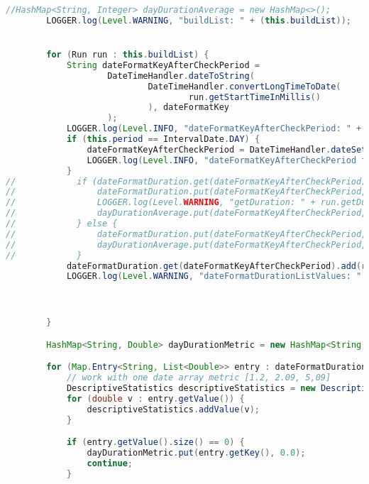 \begin{lstlisting}[language=Java]
        //HashMap<String, Integer> dayDurationAverage = new HashMap<>();
        LOGGER.log(Level.WARNING, "buildList: " + (this.buildList));


        for (Run run : this.buildList) {
            String dateFormatKeyAfterCheckPeriod =
                    DateTimeHandler.dateToString(
                            DateTimeHandler.convertLongTimeToDate(
                                    run.getStartTimeInMillis()
                            ), dateFormatKey
                    );
            LOGGER.log(Level.INFO, "dateFormatKeyAfterCheckPeriod: " + dateFormatKeyAfterCheckPeriod);
            if (this.period == IntervalDate.DAY) {
                dateFormatKeyAfterCheckPeriod = DateTimeHandler.dateSetZeroMinutesSeconds(dateFormatKeyAfterCheckPeriod);
                LOGGER.log(Level.INFO, "dateFormatKeyAfterCheckPeriod for day zero: " + dateFormatKeyAfterCheckPeriod);
            }
//            if (dateFormatDuration.get(dateFormatKeyAfterCheckPeriod) == 0.0) {
//                dateFormatDuration.put(dateFormatKeyAfterCheckPeriod, run.getDuration() / 1000.0);
//                LOGGER.log(Level.WARNING, "getDuration: " + run.getDuration());
//                dayDurationAverage.put(dateFormatKeyAfterCheckPeriod, 1);
//            } else {
//                dateFormatDuration.put(dateFormatKeyAfterCheckPeriod, dateFormatDuration.get(dateFormatKeyAfterCheckPeriod) + run.getDuration() / 1000.0);
//                dayDurationAverage.put(dateFormatKeyAfterCheckPeriod, dayDurationAverage.get(dateFormatKeyAfterCheckPeriod) + 1);
//            }
            dateFormatDuration.get(dateFormatKeyAfterCheckPeriod).add(run.getDuration() / 1000.0);
            LOGGER.log(Level.WARNING, "dateFormatDurationListValues: " + dateFormatDuration);



        }

        HashMap<String, Double> dayDurationMetric = new HashMap<String, Double>();

        for (Map.Entry<String, List<Double>> entry : dateFormatDuration.entrySet()) {
            // work with one date array metric [1.2, 2.09, 5,09]
            DescriptiveStatistics descriptiveStatistics = new DescriptiveStatistics();
            for (double v : entry.getValue()) {
                descriptiveStatistics.addValue(v);
            }

            if (entry.getValue().size() == 0) {
                dayDurationMetric.put(entry.getKey(), 0.0);
                continue;
            }


\end{lstlisting}
